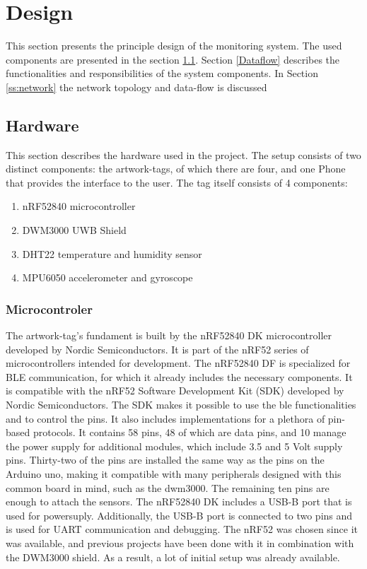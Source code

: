 \chapter{Design}
\label{c:design}

This section presents the principle design of the monitoring system.
The used components are presented in the section \ref{ss:hardware}.
Section \ref{Dataflow} describes the functionalities and responsibilities of the system components.
In Section \ref{ss:network} the network topology and data-flow is discussed

\section{Hardware}
\label{ss:hardware}

This section describes the hardware used in the project. The setup consists of two distinct components: the artwork-tags, of which there are four, and one Phone that provides the interface to the user. The tag itself consists of 4 components:
\begin{enumerate}
	\item nRF52840 microcontroller
	\item DWM3000 UWB Shield
	\item DHT22 temperature and humidity sensor
	\item MPU6050 accelerometer and gyroscope
\end{enumerate}

\subsection{Microcontroler}
The artwork-tag's fundament is built by the nRF52840 DK microcontroller developed by Nordic Semiconductors. 
It is part of the nRF52 series of microcontrollers intended for development.
The nRF52840 DF is specialized for BLE communication, for which it already includes the necessary components.
It is compatible with the nRF52 Software Development Kit (SDK) developed by Nordic Semiconductors.
The SDK makes it possible to use the ble functionalities and to control the pins. 
It also includes implementations for a plethora of pin-based protocols.
It contains 58 pins, 48 of which are data pins, and 10 manage the power supply for additional modules, which include 3.5 and 5 Volt supply pins.
Thirty-two of the pins are installed the same way as the pins on the Arduino uno, making it compatible with many peripherals designed with this common board in mind, such as the dwm3000.
The remaining ten pins are enough to attach the sensors.
The nRF52840 DK includes a USB-B port that is used for powersuply. Additionally, the USB-B port is connected to two pins and is used for UART communication and debugging.
The nRF52 was chosen since it was available, and previous projects have been done with it in combination with the DWM3000 shield.
As a result, a lot of initial setup was already available.

